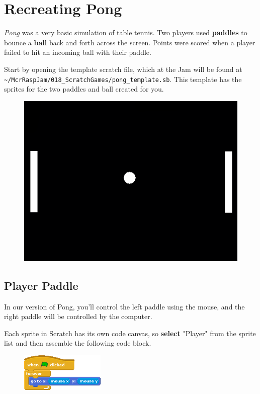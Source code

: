 \section{Recreating Pong}

	\textit{Pong} was a very basic simulation of table tennis. Two players used \textbf{paddles} to bounce a \textbf{ball} back and forth across the screen. Points were scored when a player failed to hit an incoming ball with their paddle.
	
	Start by opening the template scratch file, which at the Jam will be found at \texttt{\textasciitilde{}/McrRaspJam/018\_ScratchGames/pong\_template.sb}. This template has the sprites for the two paddles and ball created for you.
	
	\begin{figure}[h]
		\centering
		\includegraphics[width=0.4\linewidth]{McrRaspJam/018_ScratchGames/scrn/template}
		\label{fig:template}
	\end{figure}


	\subsection{Player Paddle}
	
		In our version of Pong, you'll control the left paddle using the mouse, and the right paddle will be controlled by the computer.
		
		Each sprite in Scratch has its own code canvas, so \textbf{select} "Player" from the sprite list and then assemble the following code block.
		
		\begin{figure}[h!]
			\centering
			\includegraphics[height=69px]{McrRaspJam/018_ScratchGames/code/1_followmouse1}
			\label{fig:followmouse1}
		\end{figure}
		
